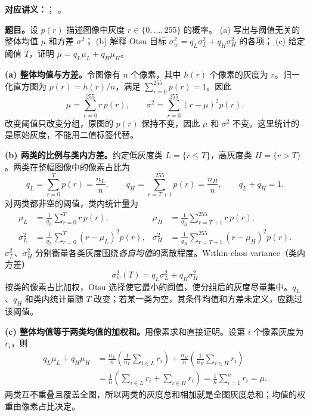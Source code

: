 \textbf{对应讲义：}；
。
\par\nopagebreak[4]

\textbf{题目。}设 $p(r)$ 描述图像中灰度 $r\in\{0,\ldots,255\}$ 的概率。
(a) 写出与阈值无关的整体均值 $\mu$ 和方差 $\sigma^2$；
(b) 解释 Otsu 目标 $\sigma_w^2=q_L\sigma_L^2+q_H\sigma_H^2$ 的各项；
(c) 给定阈值 $T$，证明 $\mu=q_L\mu_L+q_H\mu_H$。

\begin{checkedsolution}
\textbf{(a) 整体均值与方差。}令图像有 $n$ 个像素，其中 $h(r)$ 个像素的灰度为 $r$。归一化直方图为 $p(r)=h(r)/n$，满足 $\sum_{r=0}^{255}p(r)=1$。因此
\[
  \boxed{\mu=\sum_{r=0}^{255}r\,p(r)},\qquad
  \boxed{\sigma^2=\sum_{r=0}^{255}(r-\mu)^2p(r)}.
\]
改变阈值只改变分组，原图的 $p(r)$ 保持不变，因此 $\mu$ 和 $\sigma^2$ 不变。这里统计的是原始灰度，不能用二值标签代替。

\textbf{(b) 两类的比例与类内方差。}约定低灰度类 $L=\{r\le T\}$，高灰度类 $H=\{r>T\}$。两类在整幅图像中的像素占比为
\[
  q_L=\sum_{r=0}^{T}p(r)=\frac{n_L}{n},\qquad
  q_H=\sum_{r=T+1}^{255}p(r)=\frac{n_H}{n},\qquad q_L+q_H=1.
\]
对两类都非空的阈值，类内统计量为
\[
\begin{aligned}
  \mu_L&=\frac{1}{q_L}\sum_{r=0}^{T}r\,p(r),&
  \mu_H&=\frac{1}{q_H}\sum_{r=T+1}^{255}r\,p(r),\\
  \sigma_L^2&=\frac{1}{q_L}\sum_{r=0}^{T}(r-\mu_L)^2p(r),&
  \sigma_H^2&=\frac{1}{q_H}\sum_{r=T+1}^{255}(r-\mu_H)^2p(r).
\end{aligned}
\]
$\sigma_L^2$、$\sigma_H^2$ 分别衡量各类灰度围绕\emph{各自均值}的离散程度。Within-class variance（类内方差）
\[
  \boxed{\sigma_w^2(T)=q_L\sigma_L^2+q_H\sigma_H^2}
\]
按类的像素占比加权，Otsu 选择使它最小的阈值，使分组后的灰度尽量集中。$q_L$、$q_H$ 和类内统计量随 $T$ 改变；若某一类为空，其条件均值和方差未定义，应跳过该阈值。

\textbf{(c) 整体均值等于两类均值的加权和。}用像素求和直接证明。设第 $i$ 个像素灰度为 $r_i$，则
\[
\begin{aligned}
  q_L\mu_L+q_H\mu_H
  &=\frac{n_L}{n}\left(\frac{1}{n_L}\sum_{i\in L}r_i\right)
    +\frac{n_H}{n}\left(\frac{1}{n_H}\sum_{i\in H}r_i\right)\\
  &=\frac{1}{n}\left(\sum_{i\in L}r_i+\sum_{i\in H}r_i\right)
   =\frac{1}{n}\sum_{i=1}^{n}r_i
   =\boxed{\mu}.
\end{aligned}
\]
两类互不重叠且覆盖全图，所以两类的灰度总和相加就是全图灰度总和；均值的权重由像素占比决定。
\end{checkedsolution}

